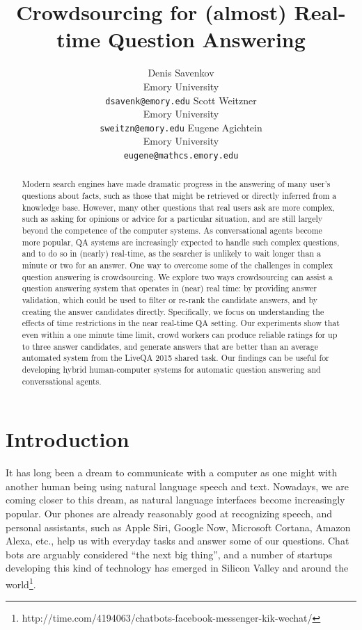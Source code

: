 \documentclass[11pt,letterpaper]{article}
\title{Crowdsourcing for (almost) Real-time Question Answering}
\author{Denis Savenkov \\ Emory University \\ {\tt dsavenk@emory.edu} 
  \And Scott Weitzner \\ Emory University \\ {\tt sweitzn@emory.edu}
  \And Eugene Agichtein \\ Emory University \\ {\tt eugene@mathcs.emory.edu}
}
\date{}
\begin{document}
\maketitle

\begin{abstract}

Modern search engines have made dramatic progress in the answering of many user's questions about facts, such as those that might be retrieved or directly inferred from a knowledge base.
However, many other questions that real users ask are more complex, such as asking for opinions or advice for a particular situation, and are still largely beyond the competence of the computer systems.
As conversational agents become more popular, QA systems are increasingly expected to handle such complex questions, and to do so in (nearly) real-time, as the searcher is unlikely to wait longer than a minute or two for an answer.
One way to overcome some of the challenges in complex question answering is crowdsourcing.
We explore two ways crowdsourcing can assist a question answering system that operates in (near) real time: by providing answer validation, which could be used to filter or re-rank the candidate answers, and by creating the answer candidates directly.
Specifically, we focus on understanding the effects of time restrictions in the near real-time QA setting.
Our experiments show that even within a one minute time limit, crowd workers can produce reliable ratings for up to three answer candidates, and generate answers that are better than an average automated system from the LiveQA 2015 shared task.
Our findings can be useful for developing hybrid human-computer systems for automatic question answering and conversational agents.

\end{abstract}

\section{Introduction}
\label{sec:introduction}

It has long been a dream to communicate with a computer as one might with another human being using natural language speech and text.
Nowadays, we are coming closer to this dream, as natural language interfaces become increasingly popular.
Our phones are already reasonably good at recognizing speech, and personal assistants, such as Apple Siri, Google Now, Microsoft Cortana, Amazon Alexa, etc., help us with everyday tasks and answer some of our questions.
Chat bots are arguably considered ``the next big thing'', and a number of startups developing this kind of technology has emerged in Silicon Valley and around the world\footnote{http://time.com/4194063/chatbots-facebook-messenger-kik-wechat/}.
\end{document}
